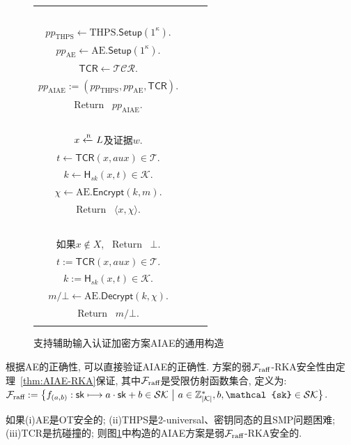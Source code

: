 {\renewcommand{\baselinestretch}{1.2} \normalsize
\begin{figure}[ht]
\centering
{\begin{tabular}{|c|c|c|}
\hline
~\makecell[l]{
\underline{$\text{AIAE}.\mathsf{Setup}(1^\kappa)$:}  \\
$pp_{\text{THPS}} \leftarrow \text{THPS}.\mathsf{Setup}(1^{\kappa})$. \\
$pp_{\text{AE}} \leftarrow \text{AE}.\mathsf{Setup}(1^{\kappa})$. \\
$\mathsf{TCR} \leftarrow \mathcal{TCR}$.  \\
$pp_{\text{AIAE}} := (pp_{\text{THPS}}, pp_{\text{AE}}, \mathsf{TCR})$. \\
Return~ $pp_{\text{AIAE}}$. \\
}~     &
~\makecell[l]{
\underline{$\text{AIAE}.\mathsf{Encrypt}(sk, m, aux)$:} \\
$x \xleftarrow{\textup{\tiny R}} L$及证据$w$. \\
$t \leftarrow \textsf{TCR}(x, aux) \in \mathcal{T}$. \\
$k \leftarrow  \mathsf{H}_{sk}(x, t) \in \mathcal{K}$. \\
$\chi \leftarrow \text{AE}.\mathsf{Encrypt}(k, m)$. \\
Return~ $\langle x, \chi \rangle$. \\
}~     &
~\makecell[l]{
\underline{$\text{AIAE}.\mathsf{Decryp}(sk, \langle  x, \chi \rangle, aux)$:} \\
如果$x \notin X$, ~Return~ $\bot$. \\
$t := \textsf{TCR}(x, aux) \in \mathcal{T}$. \\
$k := \mathsf{H}_{sk}(x, t)   \in \mathcal{K}$. \\
$m / \bot \leftarrow \text{AE}.\mathsf{Decrypt}(k, \chi)$. \\
Return~ $m / \bot$. \\
}~        \\\hline
\end{tabular}}\caption{支持辅助输入认证加密方案AIAE的通用构造}\label{fig:AIAE-Con}
\end{figure}
}

根据AE的正确性, 可以直接验证AIAE的正确性. 方案的弱$\mathcal{F}_{\text{raff}}$-RKA安全性由定理~\ref{thm:AIAE-RKA}保证, 其中$\mathcal{F}_{\text{raff}}$是受限仿射函数集合, 定义为: $\F_{\text{raff}}: = \big\{f_{(a, b)}: \mathsf{sk} \longmapsto a \cdot \mathsf{sk}  + b \in \mathcal{SK} ~\big|~a \in \mathbb{Z}_{| \mathcal{K} |}^*, b, \mathcal{sk} \in \mathcal{SK} \big\}$.
\begin{theorem} \label{thm:AIAE-RKA}
如果(i)AE是OT安全的;
(ii)THPS是2-universal、密钥同态的且SMP问题困难;
(iii)TCR是抗碰撞的;
则图\ref{fig:AIAE-Con}中构造的AIAE方案是弱$\mathcal{F}_{\text{raff}}$-RKA安全的.
\end{theorem}

